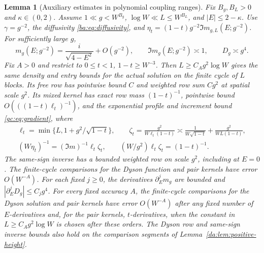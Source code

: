 \documentclass[11pt]{article}
\numberwithin{equation}{section}
\newtheorem{lemma}[theorem]{Lemma}
\theoremstyle{remark}
\begin{document}
\begin{lemma}[Auxiliary estimates in polynomial coupling ranges]
\label{da:lem:polynomial-derivatives}
Fix $B_g,B_L>0$ and $\kappa\in(0,2)$. Assume $1\ll g<W^{B_g}$,
$\log W\ll L\le W^{B_L}$, and $|E|\le2-\kappa$.
Use $\gamma=g^{-2}$, the diffusivity \eqref{ba:eq:diffusivity}, and
$\eta_t=(1-t)g^{-2}\Im m_{g,L}(E;g^{-2})$.
For sufficiently large $g$,
\[
 m_g(E;g^{-2})=\frac{i}{\sqrt{4-E^2}}+O(g^{-2}),\qquad
 \Im m_g(E;g^{-2})\asymp1,\qquad D_g\asymp g^4.
\]
Fix $A>0$ and restrict to $0\le t<1$, $1-t\ge W^{-3}$.
Then $L\ge C_Ag^2\log W$ gives the same density and
entry bounds for the actual solution on the finite cycle of $L$ blocks. Its free row has
pointwise bound $C$ and weighted row sum $Cg^2$ at spatial scale $g^2$.
Its mixed kernel has exact row mass $(1-t)^{-1}$, pointwise bound
$O(((1-t)\ell_t)^{-1})$, and the exponential profile and increment
bound \eqref{gc:eq:gradient}, where
\begin{equation}\label{ll:eq:normalization}
 \begin{gathered}
 \ell_t=\min\{L,1+g^2/\sqrt{1-t}\},\qquad
 \zeta_t=\frac{g^2}{W\ell_t(1-t)}
 \asymp\frac1{W\sqrt{1-t}}+\frac{g^2}{WL(1-t)},\\
 (W\eta_t)^{-1}=(\Im m)^{-1} \ell_t\zeta_t,\qquad
 (W/g^2)\ell_t\zeta_t=(1-t)^{-1}.
 \end{gathered}
\end{equation}
The same-sign inverse has a bounded weighted row on scale $g^2$,
including at $E=0$. The finite-cycle comparisons for the Dyson function and pair kernels
have error $O(W^{-A})$.
For each fixed $j\ge0$, the derivatives $\partial_E^j m_g$ are bounded and
$|\partial_E^jD_g|\le C_jg^4$. For every fixed accuracy $A$, the
finite-cycle comparisons for the Dyson solution and pair kernels have
error $O(W^{-A})$ after any fixed number of $E$-derivatives and, for
the pair kernels, $t$-derivatives, when the constant in
$L\ge C_Ag^2\log W$ is chosen after these orders. The Dyson row and
same-sign inverse bounds also hold on the comparison segments of
Lemma~\ref{da:lem:positive-height}.
\end{lemma}
\end{document}
